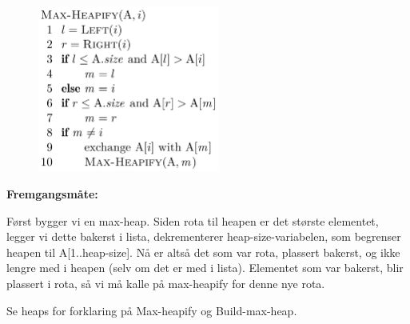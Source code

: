 \documentclass[12pt]{report}
\begin{document}
\begin{multicols}{2}

\begin{figure}[H]
	\begin{Center}
		\includegraphics[width=2.35in,height=2.15in]{./media/image32.png}
	\end{Center}
\end{figure}



\par


\vspace{\baselineskip}

\end{multicols}

\vspace{\baselineskip}
\textbf{Fremgangsmåte:}\par

Først bygger vi en max-heap. Siden rota til heapen er det største elementet, legger vi dette bakerst i lista, dekrementerer heap-size-variabelen, som begrenser heapen til A[1..heap-size]. Nå er altså det som var rota, plassert bakerst, og ikke lengre med i heapen (selv om det er med i lista). Elementet som var bakerst, blir plassert i rota, så vi må kalle på max-heapify for denne nye rota. \par


\vspace{\baselineskip}
Se heaps for forklaring på Max-heapify og Build-max-heap.


\newpage
\par

\setlength{\parskip}{6.0pt}
\end{document}
